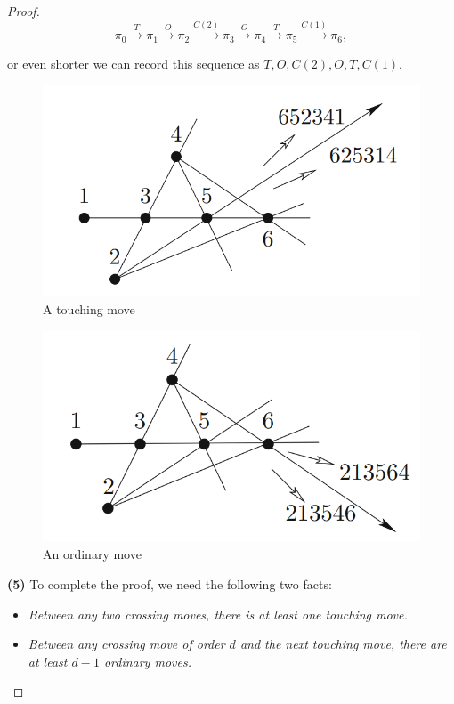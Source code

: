 \documentclass[a4paper]{article}
\begin{document}
\begin{proof}
\[\pi_0 \overset{T}{\longrightarrow} \pi_1 \overset{O}{\longrightarrow} \pi_2 \overset{C(2)}{\longrightarrow} \pi_3 \overset{O}{\longrightarrow} \pi_4 \overset{T}{\longrightarrow} \pi_5 \overset{C(1)}{\longrightarrow} \pi_6,\]               

\noindent
or even shorter we can record this sequence as $T, O, C(2), O, T, C(1)$.

\begin{figure}[H]
    \centering
    \includegraphics[scale=0.4]{pics/picture7.png}
    \caption{A touching move}
\end{figure}

\begin{figure}[H]
    \centering
    \includegraphics[scale=0.4]{pics/picture8.png}
    \caption{An ordinary move}
\end{figure}

\noindent
\textbf{(5)} To complete the proof, we need the following two facts:

\begin{itemize}
\item[ ]\textit{Between any two crossing moves, there is at least one touching move.}
\item[ ]\textit{Between any crossing move of order $d$ and the next touching move, there are at least $d - 1$ ordinary moves.}
\end{itemize}


\end{proof}
\end{document}
